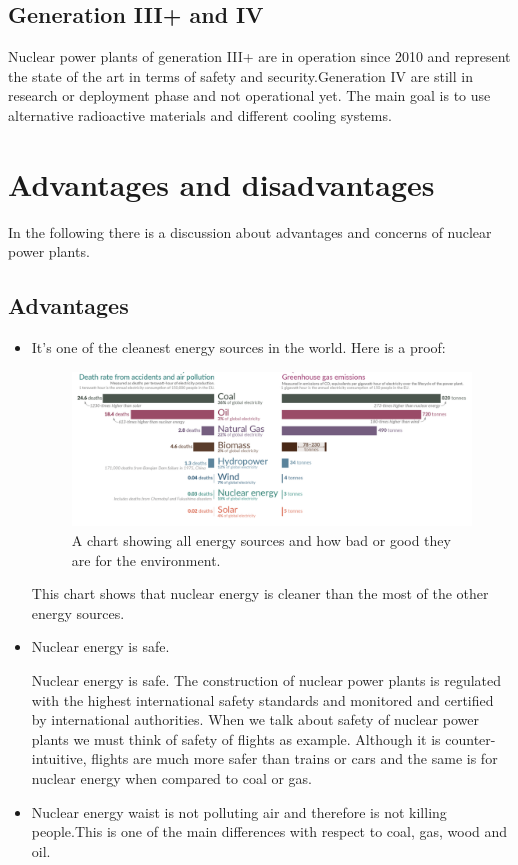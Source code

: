\documentclass{article}
\begin{document}
\subsection{Generation III+ and IV}
Nuclear power plants of generation III+ are in operation since 2010 and represent the state of the art in terms of safety and security.Generation IV are still in research or deployment phase and not operational yet. The main goal is to use alternative radioactive materials and different cooling systems.

\section{Advantages and disadvantages}
In the following there is a discussion about advantages and concerns of nuclear power plants.

\subsection{Advantages}
\begin{itemize}
    \item It's one of the cleanest energy sources in the world.
    Here is a proof:
    \begin{figure}
        \centering
        \includegraphics[width=1.39\linewidth]{AAAAASUKA.png}
        \caption{A chart showing all energy sources and how bad or good they are for the environment\protect\footnotemark.}
        \label{fig:enter-label}
    \end{figure}

This chart shows that nuclear energy is cleaner than the most of the other energy sources.

\item Nuclear energy is safe.

Nuclear energy is safe. The construction of nuclear power plants is regulated with the highest international safety standards and monitored and certified by international authorities. When we talk about safety of nuclear power plants we must think of safety of flights as example. Although it is counter-intuitive, flights are much more safer than trains or cars and the same is for nuclear energy when compared to coal or gas.

\item Nuclear energy waist is not polluting air and therefore is not killing people.This is one of the main differences with respect to coal, gas, wood and oil.


\end{itemize}
\end{document}
